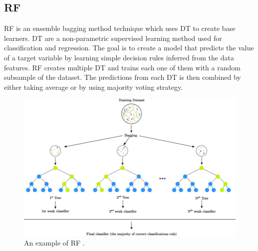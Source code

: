 \documentclass[twoside,11pt,a4paper]{article}
\begin{document}
\subsection{\acf{RF}}
\acf{RF} \citep{breiman2001random} is an ensemble bagging method technique which uses \acf{DT} to create base learners. \acs{DT} are a non-parametric supervised learning method used for classification and regression. The goal is to create a model that predicts the value of a target variable by learning simple decision rules inferred from the data features. \acs{RF} creates multiple \acs{DT} and trains each one of them with a random subsample of the dataset. The predictions from each \acs{DT} is then combined by either taking average or by using majority voting strategy.\\
\begin{figure}[ht]
	\centering
	\includegraphics[width=1\textwidth]{random_forest}
	\caption[An example \acs{RF}. ]{An example of \acf{RF} \cite{sapountzoglou2020fault}.}
	\label{fig:random_forest}
\end{figure}
\FloatBarrier
\end{document}
